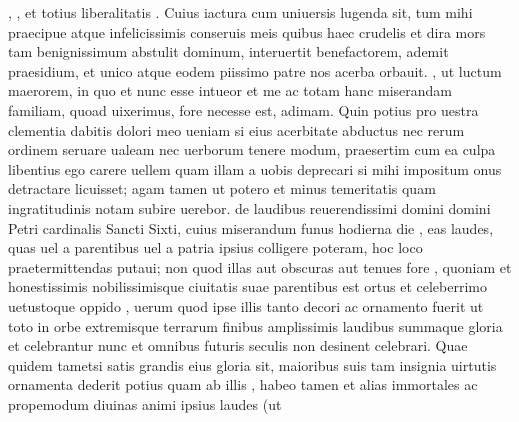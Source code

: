 \documentclass[a5paper,twoside]{article}
\begin{document}
\begin{pages}
\begin{Leftside}
, , et totius liberalitatis . Cuius iactura cum uniuersis lugenda sit, tum mihi praecipue atque  infelicissimis conseruis meis quibus haec crudelis et dira mors tam benignissimum abstulit dominum, interuertit benefactorem, ademit praesidium, et unico atque eodem piissimo patre nos acerba orbauit. , ut luctum  maerorem, in quo et  nunc esse intueor et me ac totam hanc miserandam familiam, quoad uixerimus, fore necesse est,  adimam. Quin potius pro uestra clementia dabitis dolori meo ueniam si eius acerbitate abductus nec rerum ordinem seruare ualeam nec uerborum tenere modum, praesertim cum ea culpa libentius ego carere uellem quam illam a uobis deprecari si mihi impositum onus detractare licuisset; agam tamen ut potero et minus temeritatis quam ingratitudinis notam subire uerebor.
\pend
\pstart
{} de laudibus reuerendissimi domini domini Petri cardinalis Sancti Sixti, cuius miserandum funus hodierna die , eas laudes, quas uel a parentibus uel a patria ipsius colligere poteram, hoc loco praetermittendas putaui; non quod illas aut obscuras aut tenues fore , quoniam et honestissimis nobilissimisque ciuitatis suae parentibus est ortus et celeberrimo uetustoque  oppido , uerum quod ipse illis tanto decori ac ornamento fuerit ut toto in orbe extremisque terrarum finibus amplissimis laudibus summaque gloria et celebrantur nunc et omnibus futuris seculis non desinent celebrari. Quae quidem tametsi satis grandis eius gloria sit,  maioribus suis tam insignia uirtutis ornamenta dederit potius quam ab illis , habeo tamen et alias immortales ac propemodum diuinas animi ipsius laudes (ut 

\end{Leftside}
\end{pages}
\end{document}
